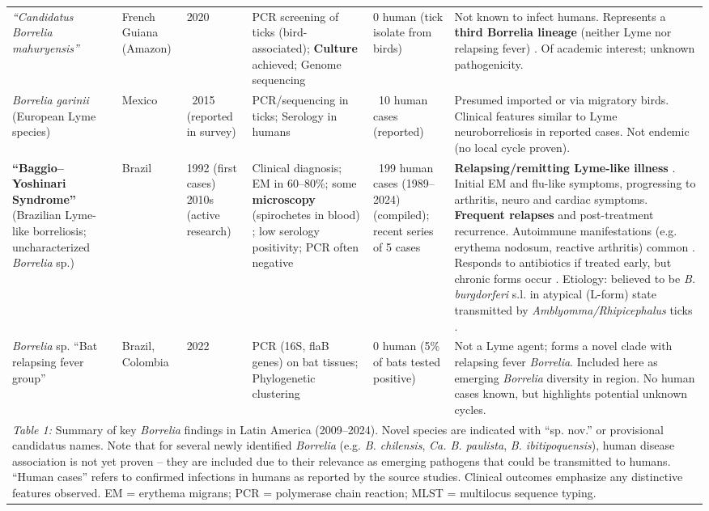 \documentclass[11pt,letterpaper]{article}
\begin{document}
\begin{table}[H]
{\begin{tabular}{@{}lllllp{4cm}@{}}
\textit{“Candidatus Borrelia mahuryensis”} & French Guiana (Amazon) & 2020 \citep{Binetruy2020i} & PCR screening of ticks (bird-associated); \textbf{Culture} achieved; Genome sequencing & 0 human (tick isolate from birds) & Not known to infect humans. Represents a \textbf{third Borrelia lineage} (neither Lyme nor relapsing fever) \citep{Binetruy2020j, Binetruy2020k}. Of academic interest; unknown pathogenicity. \\
\textit{Borrelia garinii} (European Lyme species) & Mexico & ~2015 (reported in survey) \citep{Colunga-Salas2020n} & PCR/sequencing in ticks; Serology in humans & ~10 human cases (reported) \citep{Colunga-Salas2020o} & Presumed imported or via migratory birds. Clinical features similar to Lyme neuroborreliosis in reported cases. Not endemic (no local cycle proven). \\
\textbf{“Baggio–Yoshinari Syndrome”} (Brazilian Lyme-like borreliosis; uncharacterized \textit{Borrelia} sp.) & Brazil & 1992 (first cases) 2010s (active research) & Clinical diagnosis; EM in 60–80\%; some \textbf{microscopy} (spirochetes in blood) \citep{Lucca2024p}; low serology positivity; PCR often negative & ~199 human cases (1989–2024) \citep{Labruna2024b} (compiled); recent series of 5 cases \citep{Yoshinari2022ab} & \textbf{Relapsing/remitting Lyme-like illness} \citep{Yoshinari2022ac}. Initial EM and flu-like symptoms, progressing to arthritis, neuro and cardiac symptoms. \textbf{Frequent relapses} and post-treatment recurrence. Autoimmune manifestations (e.g. erythema nodosum, reactive arthritis) common \citep{Yoshinari2022ad}. Responds to antibiotics if treated early, but chronic forms occur \citep{Yoshinari2022ae}. Etiology: believed to be \textit{B. burgdorferi} s.l. in atypical (L-form) state transmitted by \textit{Amblyomma/Rhipicephalus} ticks \citep{Yoshinari2022af}. \\
\textit{Borrelia} sp. “Bat relapsing fever group” & Brazil, Colombia & 2022 \citep{Lucca2024ag} & PCR (16S, flaB genes) on bat tissues; Phylogenetic clustering & 0 human (5\% of bats tested positive) \citep{Lucca2024ah} & Not a Lyme agent; forms a novel clade with relapsing fever \textit{Borrelia}. Included here as emerging \textit{Borrelia} diversity in region. No human cases known, but highlights potential unknown cycles. \\ \bottomrule
\multicolumn{6}{p{\textwidth}}{\textit{Table 1:} Summary of key \textit{Borrelia} findings in Latin America (2009–2024). Novel species are indicated with “sp. nov.” or provisional candidatus names. Note that for several newly identified \textit{Borrelia} (e.g. \textit{B. chilensis}, \textit{Ca. B. paulista}, \textit{B. ibitipoquensis}), human disease association is not yet proven – they are included due to their relevance as emerging pathogens that could be transmitted to humans. “Human cases” refers to confirmed infections in humans as reported by the source studies. Clinical outcomes emphasize any distinctive features observed. EM = erythema migrans; PCR = polymerase chain reaction; MLST = multilocus sequence typing.} \\
\end{tabular}%
}
\end{table}
\end{document}

